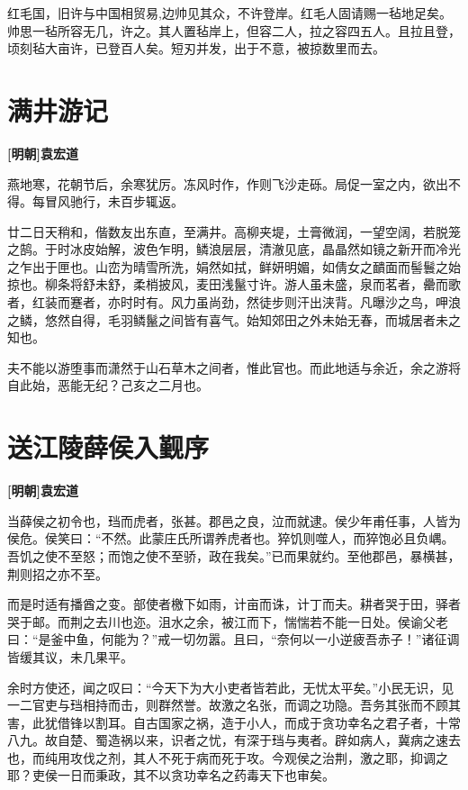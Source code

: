 \documentclass[UTF8,titlepage,oneside]{ctexbook}
\begin{document}
红毛国，旧许与中国相贸易,边帅见其众，不许登岸。红毛人固请赐一毡地足矣。帅思一毡所容无几，许之。其人置毡岸上，但容二人，拉之容四五人。且拉且登，顷刻毡大亩许，已登百人矣。短刃并发，出于不意，被掠数里而去。



\chapter*{满井游记}
\begin{center}
	\textbf{[明朝]袁宏道}
\end{center}

燕地寒，花朝节后，余寒犹厉。冻风时作，作则飞沙走砾。局促一室之内，欲出不得。每冒风驰行，未百步辄返。

廿二日天稍和，偕数友出东直，至满井。高柳夹堤，土膏微润，一望空阔，若脱笼之鹄。于时冰皮始解，波色乍明，鳞浪层层，清澈见底，晶晶然如镜之新开而冷光之乍出于匣也。山峦为晴雪所洗，娟然如拭，鲜妍明媚，如倩女之靧面而髻鬟之始掠也。柳条将舒未舒，柔梢披风，麦田浅鬣寸许。游人虽未盛，泉而茗者，罍而歌者，红装而蹇者，亦时时有。风力虽尚劲，然徒步则汗出浃背。凡曝沙之鸟，呷浪之鳞，悠然自得，毛羽鳞鬣之间皆有喜气。始知郊田之外未始无春，而城居者未之知也。

夫不能以游堕事而潇然于山石草木之间者，惟此官也。而此地适与余近，余之游将自此始，恶能无纪？己亥之二月也。


\chapter*{送江陵薛侯入觐序}
\begin{center}
	\textbf{[明朝]袁宏道}
\end{center}


当薛侯之初令也，珰而虎者，张甚。郡邑之良，泣而就逮。侯少年甫任事，人皆为侯危。侯笑曰：“不然。此蒙庄氏所谓养虎者也。猝饥则噬人，而猝饱必且负嵎。吾饥之使不至怒；而饱之使不至骄，政在我矣。”已而果就约。至他郡邑，暴横甚，荆则招之亦不至。


而是时适有播酋之变。部使者檄下如雨，计亩而诛，计丁而夫。耕者哭于田，驿者哭于邮。而荆之去川也迩。沮水之余，被江而下，惴惴若不能一日处。侯谕父老曰：“是釜中鱼，何能为？”戒一切勿嚣。且曰，“奈何以一小逆疲吾赤子！”诸征调皆缓其议，未几果平。


余时方使还，闻之叹曰：“今天下为大小吏者皆若此，无忧太平矣。”小民无识，见一二官吏与珰相持而击，则群然誉。故激之名张，而调之功隐。吾务其张而不顾其害，此犹借锋以割耳。自古国家之祸，造于小人，而成于贪功幸名之君子者，十常八九。故自楚、蜀造祸以来，识者之忧，有深于珰与夷者。辟如病人，冀病之速去也，而纯用攻伐之剂，其人不死于病而死于攻。今观侯之治荆，激之耶，抑调之耶？吏侯一日而秉政，其不以贪功幸名之药毒天下也审矣。
\end{document}

